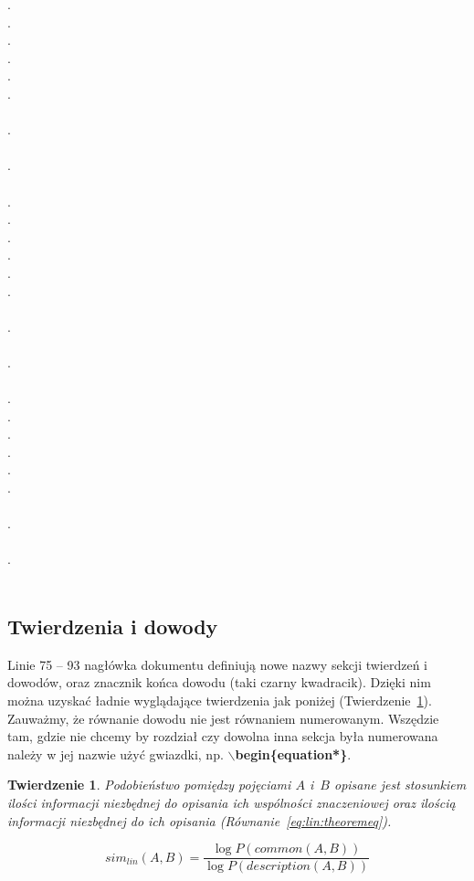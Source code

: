 \documentclass[twoside,a4paper]{book}
\newtheorem{theorem}{Twierdzenie}
\begin{document}
.\\
.\\
.\\
.\\
.\\
.\\\\
.\\\\
.\\\\
.\\
.\\
.\\
.\\
.\\
.\\\\
.\\\\
.\\\\
.\\
.\\
.\\
.\\
.\\
.\\\\
.\\\\
.\\\\





\subsection{Twierdzenia i dowody}










Linie 75 -- 93 nagłówka dokumentu definiują nowe nazwy sekcji twierdzeń i dowodów, oraz znacznik końca dowodu (taki czarny kwadracik). Dzięki nim można uzyskać ładnie wyglądające twierdzenia jak poniżej (Twierdzenie~\ref{eq:lin:theorem}). Zauważmy, że równanie dowodu nie jest równaniem numerowanym. Wszędzie tam, gdzie nie chcemy by rozdział czy dowolna inna sekcja była numerowana należy w jej nazwie użyć gwiazdki, np. \textbf{$\backslash$begin\{equation*\}}.

\begin{theorem}
	Podobieństwo pomiędzy pojęciami $A$ i~$B$ opisane jest stosunkiem ilości informacji niezbędnej do opisania ich wspólności znaczeniowej oraz ilością informacji niezbędnej do ich opisania (Równanie~\ref{eq:lin:theoremeq}).
	
	\begin{equation}
	sim_{lin}(A,B)=\frac{\log P(common(A,B))}{\log P(description(A,B))}
	\label{eq:lin:theoremeq}
	\end{equation}
	\label{eq:lin:theorem}
\end{theorem}
\end{document}
